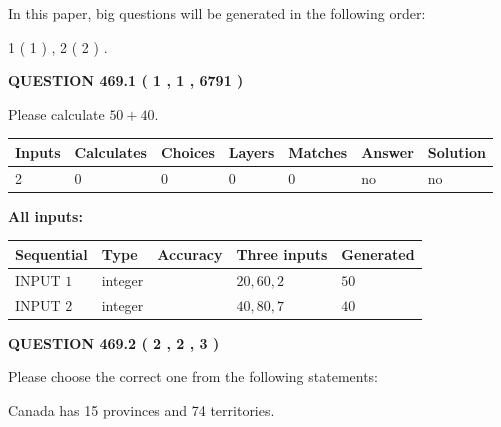 \documentclass[12pt]{article}
\begin{document}
In this paper, big questions will be generated in the following order: 
   
   
   1 ( 1 )
 ,
   2 ( 2 )
 .
  
\vspace{0.2in}
  
{\textbf{\Large{QUESTION
469.1 
 ( 1 , 1 , 6791 )
}}}
  
  
 
Please calculate $ %
50 +  %
40 $.
 
 
   
   
   
   
\noindent\begin{tabular}{|l|l|l|l|l|l|l|}
 \hline
Inputs & Calculates & Choices & Layers & Matches & Answer & Solution \\ \hline
 2  & 
 0  & 
 0
  & 
 0  & 
 0  & 
  no & 
  no 
  \\ \hline
 \end{tabular}
   
   
   
   
\noindent{}
   
   
   
   
\noindent\vspace{0.1in}\hspace{-0.08in} {\textbf{\Large{All inputs: }}}
   
   
  
  
\noindent\begin{tabular}{|l|l|l|l|l|}
\hline
 Sequential & Type & Accuracy & Three inputs & Generated \\ 
\hline
 
 
  INPUT $  1 $ & integer &  & $
 20
 , 
 60
 , 
 2
 $ & $ 50 $ 
 \\  \hline  
 
 
  INPUT $  2 $ & integer &  & $
 40
 , 
 80
 , 
 7
 $ & $ 40 $ 
 \\  \hline  
 \end{tabular}
   
   
  
\vspace{0.2in}
  
{\textbf{\Large{QUESTION
469.2 
 ( 2 , 2 , 3 )
}}}
  
  
Please choose the correct one from the following statements:
 
 
Canada has  15 provinces and  74 territories.
 
\end{document}
